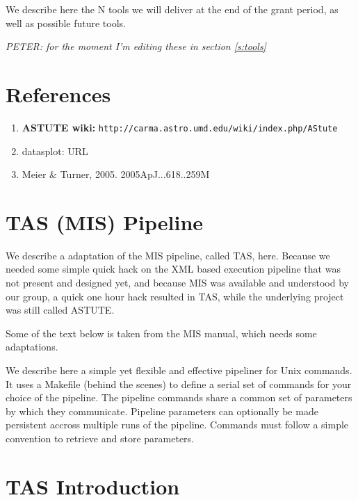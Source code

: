 \documentclass[preprint]{aastex} %
\begin{document}
We describe here the N tools we will deliver at the end of the grant
period, as well as possible future tools.

{\it  PETER: for the moment I'm editing these in section \ref{s:tools}}



\section*{References}

\begin{enumerate}
\item
{\bf ASTUTE wiki:} {\tt  http://carma.astro.umd.edu/wiki/index.php/AStute}

\item
datasplot: URL

\item
Meier \& Turner, 2005. 2005ApJ...618..259M

\end{enumerate}




\section{TAS (MIS) Pipeline}

We describe a adaptation of the MIS pipeline, called TAS, here. Because we
needed some simple quick hack on the XML based execution pipeline that was
not present and designed yet, and because MIS was available and understood
by our group, a quick one hour hack resulted in TAS, while the underlying
project was still called ASTUTE.

Some of the text below is taken from the MIS manual, which needs some adaptations.

We describe here a simple yet flexible and effective pipeliner for
Unix commands.  It uses a Makefile (behind the scenes) to define a
serial set of commands for your choice of the pipeline. The pipeline
commands share a common set of parameters by which they communicate.
Pipeline parameters can optionally be made persistent accross multiple
runs of the pipeline. Commands must follow a simple convention to
retrieve and store parameters.



\section{TAS Introduction}
\end{document}
